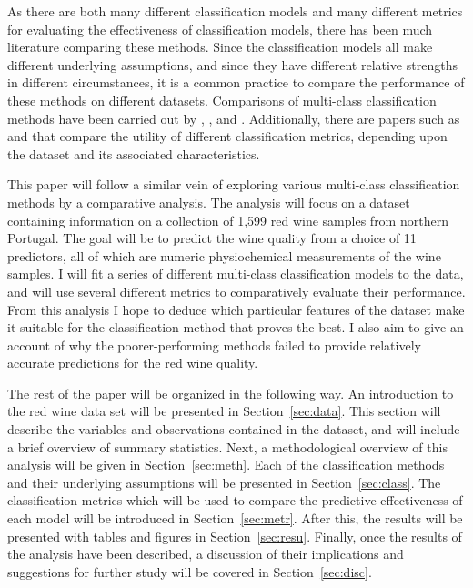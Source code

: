 \documentclass[12pt]{article}
\begin{document}
As there are both many different classification models and many different metrics 
for evaluating the effectiveness of classification models, there has been much 
literature comparing these methods.  Since the classification models all make 
different underlying assumptions, and since they have different relative strengths 
in different circumstances, it is a common practice to compare the performance of 
these methods on different datasets.  Comparisons of multi-class classification 
methods have been carried out by \citep{alsafy2014multiclass}, 
\citep{khan2023comparison}, and \citep{szollHosi2012comparison}.  Additionally, 
there are papers such as \citep{grandini2020metrics} and \citep{grandini2020metrics} 
that compare the utility of different classification metrics, depending upon the 
dataset and its associated characteristics.  

This paper will follow a similar vein of exploring various multi-class 
classification methods by a comparative analysis.  The analysis will focus on a 
dataset containing information on a collection of 1,599 red wine samples from 
northern Portugal.  The goal will be to predict the wine quality from a choice 
of 11 predictors, all of which are numeric physiochemical measurements of the wine 
samples.  I will fit a series of different multi-class classification models to 
the data, and will use several different metrics to comparatively evaluate their 
performance.  From this analysis I hope to deduce which particular features of the 
dataset make it suitable for the classification method that proves the best.  I 
also aim to give an account of why the poorer-performing methods failed to provide 
relatively accurate predictions for the red wine quality.  

The rest of the paper will be organized in the following way.  
An introduction to the red wine data set will be presented in 
Section~\ref{sec:data}.  This section will describe the variables 
and observations contained in the dataset, and will include a brief 
overview of summary statistics.  Next, a methodological overview of 
this analysis will be given in Section~\ref{sec:meth}.  Each of the 
classification methods and their underlying assumptions will be 
presented in Section~\ref{sec:class}.  The classification metrics 
which will be used to compare the predictive effectiveness of each 
model will be introduced in Section~\ref{sec:metr}.  After this, 
the results will be presented with tables and figures in 
Section~\ref{sec:resu}.  Finally, once the results of the analysis 
have been described, a discussion of their implications and 
suggestions for further study will be covered in Section~\ref{sec:disc}.
\end{document}
